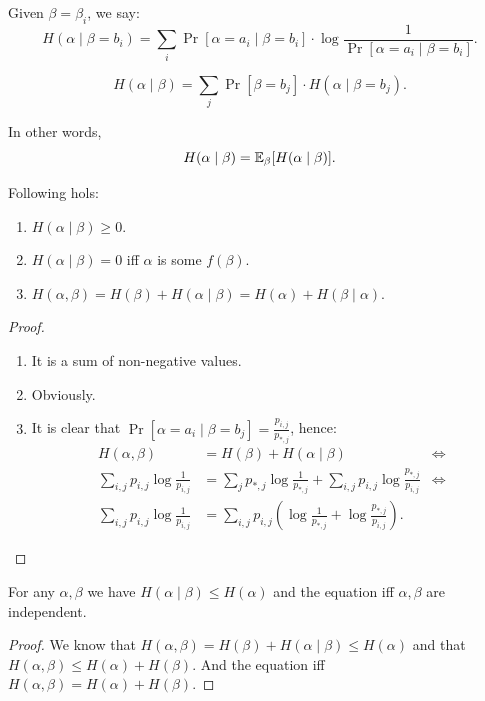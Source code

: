 \begin{definition}
    Given $\beta = \beta_i$, we say:
    \[
        H(\alpha \mid \beta = b_i) = \sum_{i} \Pr[\alpha = a_i \mid \beta = b_i] \cdot \log \frac{1}{\Pr[\alpha = a_i \mid \beta = b_i]}.
    \]
\end{definition}

\begin{definition}
    \[
        H(\alpha \mid \beta) = \sum_j \Pr[\beta = b_j] \cdot H(\alpha \mid \beta = b_j).
    \]
\end{definition}
In other words,
\[
    H(\alpha \mid \beta) = \mathbb{E}_{\beta} [H(\alpha \mid \beta)].
\]

\begin{lemma}
    Following hols:
    \begin{enumerate}
        \item $H(\alpha \mid \beta) \geq 0$.
        \item  $H(\alpha \mid \beta) = 0$ iff  $\alpha$ is some $f(\beta)$.
        \item  $H(\alpha, \beta) = H(\beta) + H(\alpha \mid \beta) = H(\alpha) + H(\beta \mid \alpha)$.
    \end{enumerate}
\end{lemma}
\begin{proof}
    \begin{enumerate}
        \item It is a sum of non-negative values.
        \item Obviously.
        \item It is clear that $\Pr[\alpha = a_i \mid \beta = b_j] = \frac{p_{i, j}}{p_{*, j}}$, hence:
        \begin{align*}
            H(\alpha, \beta) &= H(\beta) + H(\alpha \mid \beta) &\iff \\
            \sum_{i, j} p_{i, j} \log \frac{1}{p_{i, j}} &= \sum_j p_{*, j} \log \frac{1}{p_{*, j}} + \sum_{i, j} p_{i, j} \log \frac{p_{*, j}}{p_{i, j}} &\iff \\
            \sum_{i, j} p_{i, j} \log \frac{1}{p_{i, j}} &= \sum_{i, j} p_{i, j} \left(\log \frac{1}{p_{*, j}} + \log \frac{p_{*, j}}{p_{i, j}}\right).
        \end{align*}
    \end{enumerate}
\end{proof}

\begin{corollary}
    For any $\alpha, \beta$ we have $H(\alpha \mid \beta) \leq H(\alpha)$ and the equation iff $\alpha, \beta$ are independent.
\end{corollary}
\begin{proof}
    We know that $H(\alpha, \beta) = H(\beta) + H(\alpha \mid \beta) \leq H(\alpha)$ and that $H(\alpha, \beta) \leq H(\alpha) + H(\beta)$.
    And the equation iff $H(\alpha, \beta) = H(\alpha) + H(\beta)$.
\end{proof}

